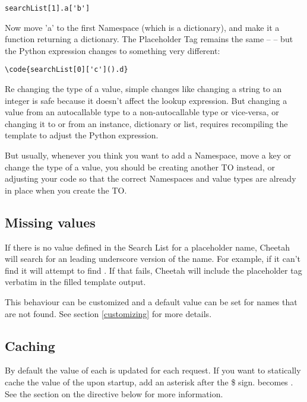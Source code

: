 \begin{verbatim}
searchList[1].a['b']
\end{verbatim}

Now move 'a' to the first Namespace (which is a dictionary), and make it a 
function returning a dictionary.  The Placeholder Tag remains the same --
 -- but the Python expression changes to something very different:

\begin{verbatim}
\code{searchList[0]['c']().d}
\end{verbatim}

Re changing the type of a value, simple changes like changing a string to an
integer is safe because it doesn't affect the lookup expression.  But 
changing a value from an autocallable type to a non-autocallable type or 
vice-versa, or changing it to or from an instance, dictionary or list, requires
recompiling the template to adjust the Python expression.

But usually, whenever you think you want to add a Namespace, move a key or
change the type of a value, you should be creating another TO instead, or
adjusting your code so that the correct Namespaces and value types are already
in place when you create the TO.


\subsection{Missing values}

If there is no value defined in the Search List for a placeholder name,
Cheetah will search for an leading underscore version of the name.  For
example, if it can't find  it will attempt to find
.  If that fails, Cheetah will include the placeholder
tag verbatim in the filled template output.

This behaviour can be customized and a default value can be set for names
that are not found. See section \ref{customizing} for more details.


\subsection{Caching}

By default the value of each  is updated for each request.
If you want to statically cache the value of the  upon
startup, add an asterisk after the \$ sign.   becomes .
See the section on the  directive below for more information.

